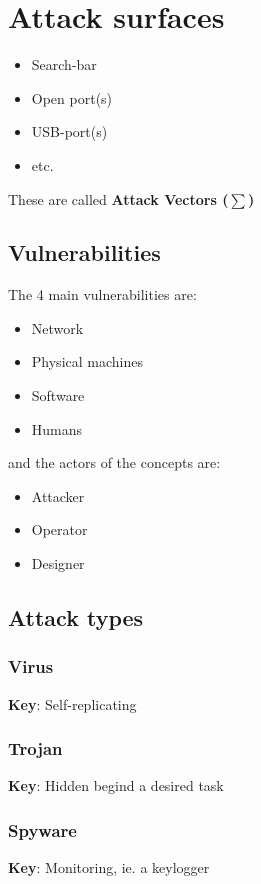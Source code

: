 \section{Attack surfaces}
\begin{flushleft}
\begin{itemize}
	\item Search-bar
	\item Open port(s)
	\item USB-port(s)
	\item etc.
\end{itemize}

These are called \textbf{Attack Vectors ($\sum$)}

\subsection{Vulnerabilities}
The 4 main vulnerabilities are:
\begin{itemize}
	\item Network
	\item Physical machines
	\item Software
	\item Humans
\end{itemize}

and the actors of the concepts are:
\begin{itemize}
	\item Attacker
	\item Operator
	\item Designer
\end{itemize}

\subsection{Attack types}
\subsubsection{Virus}
\textbf{Key}: Self-replicating

\subsubsection{Trojan}
\textbf{Key}: Hidden begind a desired task

\subsubsection{Spyware}
\textbf{Key}: Monitoring, ie. a keylogger


\end{flushleft}
